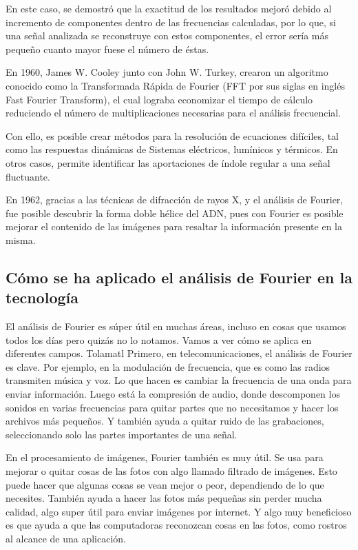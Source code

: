 En este caso, se demostró que la exactitud de los resultados mejoró debido al incremento de componentes dentro de las frecuencias calculadas, por lo que, si una señal analizada se reconstruye con estos componentes, el error sería más pequeño cuanto mayor fuese el número de éstas.

En 1960, James W. Cooley junto con John W. Turkey, crearon un algoritmo conocido como la Transformada Rápida de Fourier (FFT por sus siglas en inglés Fast Fourier Transform), el cual lograba economizar el tiempo de cálculo reduciendo el número de multiplicaciones necesarias para el análisis frecuencial.

Con ello, es posible crear métodos para la resolución de ecuaciones difíciles, tal como las respuestas dinámicas de Sistemas eléctricos, lumínicos y térmicos. En otros casos, permite identificar las aportaciones de índole regular a una señal fluctuante.

En 1962, gracias a las técnicas de difracción de rayos X, y el análisis de Fourier, fue posible descubrir la forma doble hélice del ADN, pues con Fourier es posible mejorar el contenido de las imágenes para resaltar la información presente en la misma.

\subsection{Cómo se ha aplicado el análisis de Fourier en la tecnología}

El análisis de Fourier es súper útil en muchas áreas, incluso en cosas que usamos todos los días pero quizás no lo notamos. Vamos a ver cómo se aplica en diferentes campos.
Tolamatl
Primero, en telecomunicaciones, el análisis de Fourier es clave. Por ejemplo, en la modulación de frecuencia, que es como las radios transmiten música y voz. Lo que hacen es cambiar la frecuencia de una onda para enviar información. Luego está la compresión de audio, donde descomponen los sonidos en varias frecuencias para quitar partes que no necesitamos y hacer los archivos más pequeños\cite*{wikipedia-compresion-audio-2024}. Y también ayuda a quitar ruido de las grabaciones, seleccionando solo las partes importantes de una señal.

En el procesamiento de imágenes, Fourier también es muy útil. Se usa para mejorar o quitar cosas de las fotos con algo llamado filtrado de imágenes. Esto puede hacer que algunas cosas se vean mejor o peor, dependiendo de lo que necesites. También ayuda a hacer las fotos más pequeñas sin perder mucha calidad, algo super útil para enviar imágenes por internet. Y algo muy beneficioso es que ayuda a que las computadoras reconozcan cosas en las fotos, como rostros al alcance de una aplicación.

